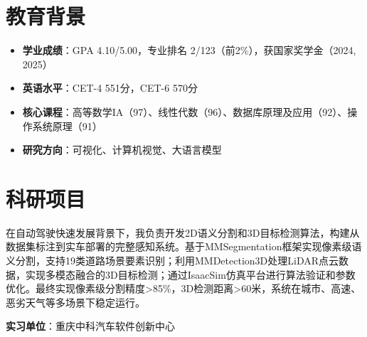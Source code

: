 \documentclass{resume}
\begin{document}


\section{教育背景}

\begin{itemize} [parsep=1ex]
  \item \textbf{学业成绩}：GPA 4.10/5.00，专业排名 2/123（前2\%），获国家奖学金（2024, 2025）
  \item \textbf{英语水平}：CET-4 551分，CET-6 570分
  \item \textbf{核心课程}：高等数学IA（97）、线性代数（96）、数据库原理及应用（92）、操作系统原理（91）
  \item \textbf{研究方向}：可视化、计算机视觉、大语言模型
\end{itemize}

\section{科研项目}

在自动驾驶快速发展背景下，我负责开发2D语义分割和3D目标检测算法，构建从数据集标注到实车部署的完整感知系统。基于MMSegmentation框架实现像素级语义分割，支持19类道路场景要素识别；利用MMDetection3D处理LiDAR点云数据，实现多模态融合的3D目标检测；通过IsaacSim仿真平台进行算法验证和参数优化。最终实现像素级分割精度>85\%，3D检测距离>60米，系统在城市、高速、恶劣天气等多场景下稳定运行。

\textbf{实习单位}：重庆中科汽车软件创新中心
\end{document}
